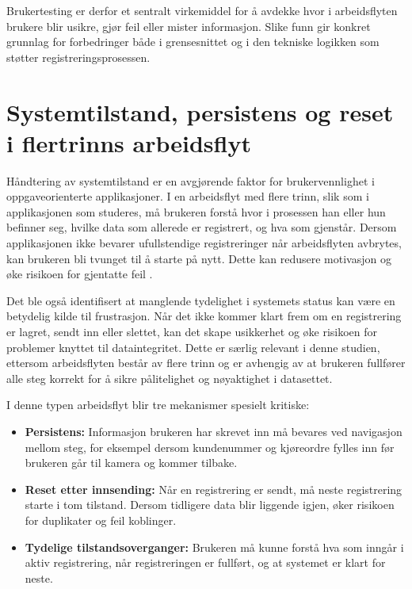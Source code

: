 Brukertesting er derfor et sentralt virkemiddel for å avdekke hvor i arbeidsflyten brukere blir usikre, gjør feil eller mister informasjon. Slike funn gir konkret grunnlag for forbedringer både i grensesnittet og i den tekniske logikken som støtter registreringsprosessen.

\section{Systemtilstand, persistens og reset i flertrinns arbeidsflyt}

Håndtering av systemtilstand er en avgjørende faktor for brukervennlighet i oppgaveorienterte applikasjoner. I en arbeidsflyt med flere trinn, slik som i applikasjonen som studeres, må brukeren forstå hvor i prosessen han eller hun befinner seg, hvilke data som allerede er registrert, og hva som gjenstår. Dersom applikasjonen ikke bevarer ufullstendige registreringer når arbeidsflyten avbrytes, kan brukeren bli tvunget til å starte på nytt. Dette kan redusere motivasjon og øke risikoen for gjentatte feil \cite{norman2013}.

Det ble også identifisert at manglende tydelighet i systemets status kan være en betydelig kilde til frustrasjon. Når det ikke kommer klart frem om en registrering er lagret, sendt inn eller slettet, kan det skape usikkerhet og øke risikoen for problemer knyttet til dataintegritet. Dette er særlig relevant i denne studien, ettersom arbeidsflyten består av flere trinn og er avhengig av at brukeren fullfører alle steg korrekt for å sikre pålitelighet og nøyaktighet i datasettet.

I denne typen arbeidsflyt blir tre mekanismer spesielt kritiske:
\begin{itemize}
    \item \textbf{Persistens:} Informasjon brukeren har skrevet inn må bevares ved navigasjon mellom steg, for eksempel dersom kundenummer og kjøreordre fylles inn før brukeren går til kamera og kommer tilbake.
    \item \textbf{Reset etter innsending:} Når en registrering er sendt, må neste registrering starte i tom tilstand. Dersom tidligere data blir liggende igjen, øker risikoen for duplikater og feil koblinger.
    \item \textbf{Tydelige tilstandsoverganger:} Brukeren må kunne forstå hva som inngår i aktiv registrering, når registreringen er fullført, og at systemet er klart for neste.
\end{itemize}


